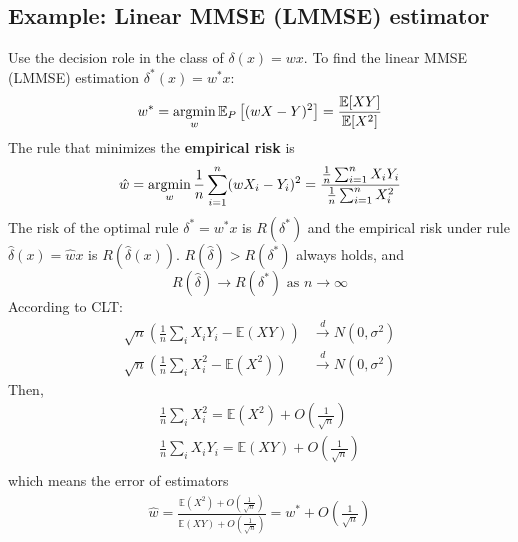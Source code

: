 \documentclass[11pt]{elegantbook}
\newcommand{\argmin}{\operatornamewithlimits{argmin}}
\begin{document}
\subsection{Example: Linear MMSE (LMMSE) estimator}
Use the decision role in the class of $\delta(x)=wx$. To find the linear MMSE (LMMSE) estimation $\delta^*(x)=w^*x$:
\begin{equation}
    \begin{aligned}
        w^*=\argmin_{w}\mathbb{E}_P\left[(wX-Y)^2\right]=\frac{\mathbb{E}[XY]}{\mathbb{E}[X^2]}
    \end{aligned}
    \nonumber
\end{equation}
The rule that minimizes the \textbf{empirical risk} is
\begin{equation}
    \begin{aligned}
        \hat{w}=\argmin_{w}\frac{1}{n}\sum_{i=1}^n(wX_i-Y_i)^2=\frac{\frac{1}{n}\sum_{i=1}^nX_iY_i}{\frac{1}{n}\sum_{i=1}^nX_i^2}
    \end{aligned}
    \nonumber
\end{equation}
The risk of the optimal rule $\delta^*=w^*x$ is $R(\delta^*)$ and the empirical risk under rule $\hat{\delta}(x)=\hat{w}x$ is $R(\hat{\delta}(x))$. $R(\hat{\delta})>R(\delta^*)$ always holds, and $$R(\hat{\delta})\rightarrow R(\delta^*)\text{ as }n \rightarrow \infty$$
According to CLT:
\begin{equation}
    \begin{aligned}
        \sqrt{n}\left(\frac{1}{n}\sum_iX_iY_i- \mathbb{E}(XY)\right) &\stackrel{d}{\longrightarrow} N(0,\sigma^2)\\
        \sqrt{n}\left(\frac{1}{n}\sum_iX_i^2- \mathbb{E}(X^2)\right) &\stackrel{d}{\longrightarrow} N(0,\sigma^2)
    \end{aligned}
    \nonumber
\end{equation}
Then,
\begin{equation}
    \begin{aligned}
        \frac{1}{n}\sum_iX_i^2=\mathbb{E}(X^2)+O(\frac{1}{\sqrt{n}})\\
        \frac{1}{n}\sum_iX_iY_i=\mathbb{E}(XY)+O(\frac{1}{\sqrt{n}})\\
    \end{aligned}
    \nonumber
\end{equation}
which means the error of estimators
\begin{equation}
    \begin{aligned}
        \hat{w}=\frac{\mathbb{E}(X^2)+O(\frac{1}{\sqrt{n}})}{\mathbb{E}(XY)+O(\frac{1}{\sqrt{n}})}=w^*+O(\frac{1}{\sqrt{n}})
    \end{aligned}
    \nonumber
\end{equation}
\end{document}
